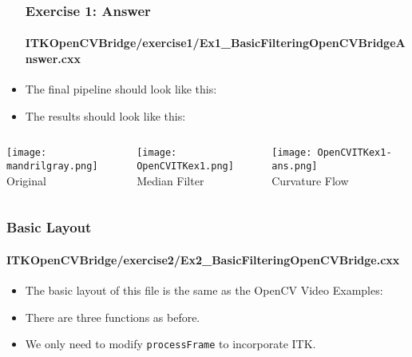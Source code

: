 \begin{frame}
\begin{itemize}
\frametitle{Exercise 1: Answer}
\framesubtitle{ITKOpenCVBridge/exercise1/Ex1\_BasicFilteringOpenCVBridgeAnswer.cxx}
\item The final pipeline should look like this:
\end{itemize}
\end{frame}

\begin{frame}
\begin{itemize}
\frametitle{Exercise 1: Answer}
\framesubtitle{ITKOpenCVBridge/exercise1/Ex1\_BasicFilteringOpenCVBridgeAnswer.cxx}
\item The results should look like this:
\end{itemize}
\begin{columns}[c]
\begin{center}
\texttt{[image: mandrilgray.png]} \\
Original
\end{center}
\begin{center}
\texttt{[image: OpenCVITKex1.png]} \\
Median Filter
\end{center}
\begin{center}
\texttt{[image: OpenCVITKex1-ans.png]} \\
Curvature Flow
\end{center}
\end{columns}
\end{frame}


\begin{frame}
\frametitle{Basic Layout}
\framesubtitle{ITKOpenCVBridge/exercise2/Ex2\_BasicFilteringOpenCVBridge.cxx}
\begin{itemize}
\item The basic layout of this file is the same as the OpenCV Video
  Examples:
\item There are three functions as before.
\pause
\item We only need to modify {\tt processFrame} to incorporate ITK.
\end{itemize}
\end{frame}

